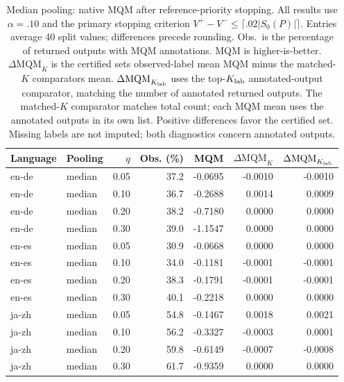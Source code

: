 \begin{table}[t]
\centering\small
\begin{tabular}{llrrrrr}
\toprule
Language & Pooling & $q$ & Obs. (\%) & MQM & $\Delta\mathrm{MQM}_K$ & $\Delta\mathrm{MQM}_{K_{\rm lab}}$ \\
\midrule
en-de & median & 0.05 & 37.2 & -0.0695 & -0.0010 & -0.0010 \\
en-de & median & 0.10 & 36.7 & -0.2688 & 0.0014 & 0.0009 \\
en-de & median & 0.20 & 38.2 & -0.7180 & 0.0000 & 0.0000 \\
en-de & median & 0.30 & 39.0 & -1.1547 & 0.0000 & 0.0000 \\
en-es & median & 0.05 & 30.9 & -0.0668 & 0.0000 & 0.0000 \\
en-es & median & 0.10 & 34.0 & -0.1181 & -0.0001 & -0.0001 \\
en-es & median & 0.20 & 38.3 & -0.1791 & -0.0001 & -0.0001 \\
en-es & median & 0.30 & 40.1 & -0.2218 & 0.0000 & 0.0000 \\
ja-zh & median & 0.05 & 54.8 & -0.1467 & 0.0018 & 0.0021 \\
ja-zh & median & 0.10 & 56.2 & -0.3327 & -0.0003 & 0.0001 \\
ja-zh & median & 0.20 & 59.8 & -0.6149 & -0.0007 & -0.0008 \\
ja-zh & median & 0.30 & 61.7 & -0.9359 & 0.0000 & 0.0000 \\
\bottomrule
\end{tabular}
\caption{Median pooling: native MQM after reference-priority stopping. All results use $\alpha=.10$ and the primary stopping criterion $V^+-V^-\le\lceil.02|S_0(P)|\rceil$. Entries average 40 split values; differences precede rounding. Obs.\ is the percentage of returned outputs with MQM annotations. MQM is higher-is-better. $\Delta\mathrm{MQM}_K$ is the certified set\textquotesingle s observed-label mean MQM minus the matched-$K$ comparator\textquotesingle s mean. $\Delta\mathrm{MQM}_{K_{\rm lab}}$ uses the top-$K_{\rm lab}$ annotated-output comparator, matching the number of annotated returned outputs. The matched-$K$ comparator matches total count; each MQM mean uses the annotated outputs in its own list. Positive differences favor the certified set. Missing labels are not imputed; both diagnostics concern annotated outputs.}
\label{tab:review-mqm-median}
\end{table}
